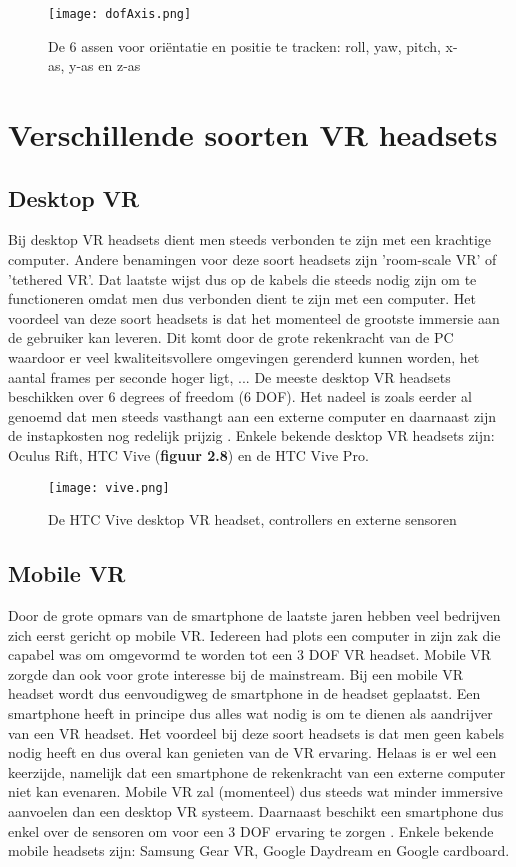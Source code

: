 \begin{figure}[h]
    \centering
    \texttt{[image: dofAxis.png]}
    \caption{De 6 assen voor oriëntatie en positie te tracken: roll, yaw, pitch, x-as, y-as en z-as \autocite{Weis2018}}
\end{figure}

\pagebreak

\section{Verschillende soorten VR headsets}

\subsection{Desktop VR}
Bij desktop VR headsets dient men steeds verbonden te zijn met een krachtige computer. Andere benamingen voor deze soort headsets zijn 'room-scale VR' of 'tethered VR'. Dat laatste wijst dus op de kabels die steeds nodig zijn om te functioneren omdat men dus verbonden dient te zijn met een computer. Het voordeel van deze soort headsets is dat het momenteel de grootste immersie aan de gebruiker kan leveren. Dit komt door de grote rekenkracht van de PC waardoor er veel kwaliteitsvollere omgevingen gerenderd kunnen worden, het aantal frames per seconde hoger ligt, ... De meeste desktop VR headsets beschikken over 6 degrees of freedom (6 DOF). Het nadeel is zoals eerder al genoemd dat men steeds vasthangt aan een externe computer en daarnaast zijn de instapkosten nog redelijk prijzig \autocite{Cherdo2018}. Enkele bekende desktop VR headsets zijn: Oculus Rift, HTC Vive (\textbf{figuur 2.8}) en de HTC Vive Pro.

\begin{figure}[h]
    \centering
    \texttt{[image: vive.png]}
    \caption{De HTC Vive desktop VR headset, controllers en externe sensoren \autocite{Vive2019}}
\end{figure}


\subsection{Mobile VR}
Door de grote opmars van de smartphone de laatste jaren hebben veel bedrijven zich eerst gericht op mobile VR. Iedereen had plots een computer in zijn zak die capabel was om omgevormd te worden tot een 3 DOF VR headset. Mobile VR zorgde dan ook voor grote interesse bij de mainstream. Bij een mobile VR headset wordt dus eenvoudigweg de smartphone in de headset geplaatst.
Een smartphone heeft in principe dus alles wat nodig is om te dienen als aandrijver van een VR headset. Het voordeel bij deze soort headsets is dat men geen kabels nodig heeft en dus overal kan genieten van de VR ervaring. Helaas is er wel een keerzijde, namelijk dat een smartphone de rekenkracht van een externe computer niet kan evenaren. Mobile VR zal (momenteel) dus steeds wat minder immersive aanvoelen dan een desktop VR systeem. Daarnaast beschikt een smartphone dus enkel over de sensoren om voor een 3 DOF ervaring te zorgen \autocite{Cherdo2018}.
Enkele bekende mobile headsets zijn: Samsung Gear VR, Google Daydream en Google cardboard.

